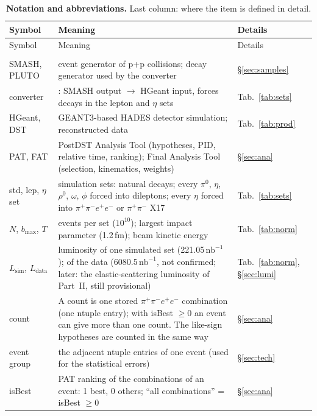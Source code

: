 \documentclass[11pt,a4paper]{article}
\renewcommand{\arraystretch}{1.15}
\newcommand{\pip}{\ensuremath{\pi^{+}}\xspace}
\newcommand{\pim}{\ensuremath{\pi^{-}}\xspace}
\newcommand{\piz}{\ensuremath{\pi^{0}}\xspace}
\newcommand{\pipi}{\ensuremath{\pi^{+}\pi^{-}}\xspace}
\newcommand{\ppee}{\ensuremath{\pi^{+}\pi^{-}e^{+}e^{-}}\xspace}
\newcommand{\nbinv}{\ensuremath{\mathrm{nb}^{-1}}\xspace}
\newcommand{\Lsim}{\ensuremath{L_{\mathrm{sim}}}\xspace}
\newcommand{\Ldata}{\ensuremath{L_{\mathrm{data}}}\xspace}
\newcommand{\code}[1]{\texttt{\detokenize{#1}}}
\begin{document}
{\footnotesize
\setlength{\tabcolsep}{4pt}
\renewcommand{\arraystretch}{1.06}
\begin{longtable}{@{}>{\raggedright\arraybackslash}p{3.0cm} >{\raggedright\arraybackslash}p{\dimexpr\textwidth-3.0cm-2.2cm-4\tabcolsep\relax} >{\raggedright\arraybackslash}p{2.2cm}@{}}
\caption{\textbf{Notation and abbreviations.} Last column: where the item is defined in detail.}
\label{tab:notation}\\
\toprule
Symbol & Meaning & Details \\
\midrule
\endfirsthead
\toprule
Symbol & Meaning & Details \\
\midrule
\endhead
\bottomrule
\endfoot
\multicolumn{3}{@{}l}{\textbf{Programs and samples}} \\
SMASH, PLUTO & event generator of p+p collisions; decay generator used by the converter & \S\ref{sec:samples} \\
converter & \code{convert-smash}: SMASH output $\to$ HGeant input, forces decays in the lepton and $\eta$ sets & Tab.~\ref{tab:sets} \\
HGeant, DST & GEANT3-based HADES detector simulation; reconstructed data & Tab.~\ref{tab:prod} \\
PAT, FAT & PostDST Analysis Tool (hypotheses, PID, relative time, ranking); Final Analysis Tool (selection, kinematics, weights) & \S\ref{sec:ana} \\
std, lep, $\eta$ set & simulation sets: natural decays; every \piz, $\eta$, $\rho^0$, $\omega$, $\phi$ forced into dileptons; every $\eta$ forced into \ppee or \pipi X17 & Tab.~\ref{tab:sets} \\
$N$, $b_{\max}$, $T$ & events per set ($10^{10}$); largest impact parameter (1.2\,fm); beam kinetic energy & Tab.~\ref{tab:norm} \\
\Lsim, \Ldata & luminosity of one simulated set (221.05\,\nbinv); of the data (6080.5\,\nbinv, not confirmed; later: the elastic-scattering luminosity of Part~II, still provisional) & Tab.~\ref{tab:norm}, \S\ref{sec:lumi} \\
count & A count is one stored \pip\pim$e^+e^-$ combination (one ntuple entry); with isBest $\ge0$ an event can give more than one count. The like-sign hypotheses are counted in the same way & \S\ref{sec:ana} \\
event group & the adjacent ntuple entries of one event (used for the statistical errors) & \S\ref{sec:tech} \\
isBest & PAT ranking of the combinations of an event: 1 best, 0 others; ``all combinations'' = isBest $\ge0$ & \S\ref{sec:ana} \\

\end{longtable}}
\end{document}
